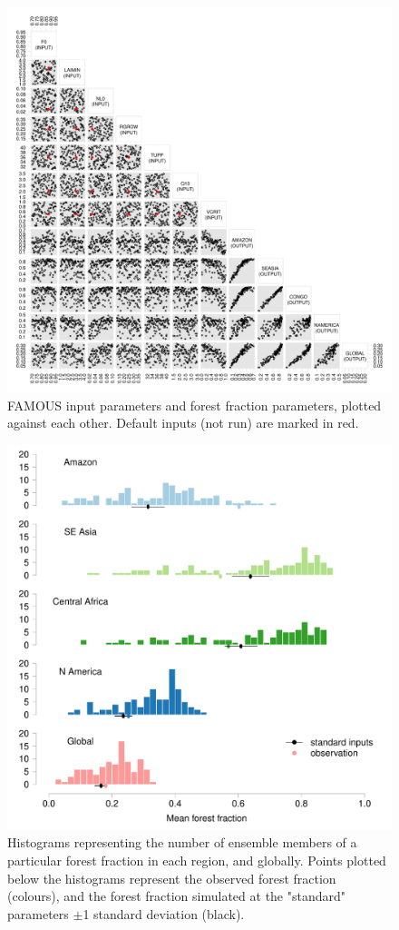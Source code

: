 \documentclass[esd, manuscript]{copernicus}
\begin{document}
\begin{figure}[t]
\includegraphics[width=12cm]{graphics/frac_pairs.pdf}
\caption{FAMOUS input parameters and forest fraction parameters, plotted against each other. Default inputs (not run) are marked in red.}
\label{fig:frac_pairs}
\end{figure}

\begin{figure}[t]
\includegraphics[width=12cm]{graphics/fraction_histogram_with_discrepancy_standard.pdf}
\caption{Histograms representing the number of ensemble members of a particular forest fraction in each region, and globally. Points plotted below the histograms represent the observed forest fraction (colours), and the forest fraction simulated at the "standard" parameters $\pm$1 standard deviation (black).}
\label{fig:fraction_histogram_with_discrepancy_standard}
\end{figure}
\end{document}
